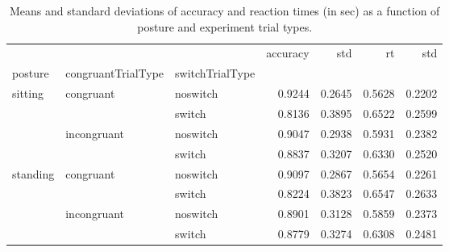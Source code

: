\begin{table}
\centering
\caption{Means and standard deviations of accuracy and reaction times (in sec) as a function of posture and experiment trial types.}
\label{table-task-switching-replication-reaction-time}
\begin{tabular}{lllrrrr}
\toprule
         &             &        & accuracy &    std &     rt &    std \\
posture & congruantTrialType & switchTrialType &          &        &        &        \\
\midrule
sitting & congruant & noswitch &   0.9244 & 0.2645 & 0.5628 & 0.2202 \\
         &             & switch &   0.8136 & 0.3895 & 0.6522 & 0.2599 \\
         & incongruant & noswitch &   0.9047 & 0.2938 & 0.5931 & 0.2382 \\
         &             & switch &   0.8837 & 0.3207 & 0.6330 & 0.2520 \\
standing & congruant & noswitch &   0.9097 & 0.2867 & 0.5654 & 0.2261 \\
         &             & switch &   0.8224 & 0.3823 & 0.6547 & 0.2633 \\
         & incongruant & noswitch &   0.8901 & 0.3128 & 0.5859 & 0.2373 \\
         &             & switch &   0.8779 & 0.3274 & 0.6308 & 0.2481 \\
\bottomrule
\end{tabular}
\end{table}
